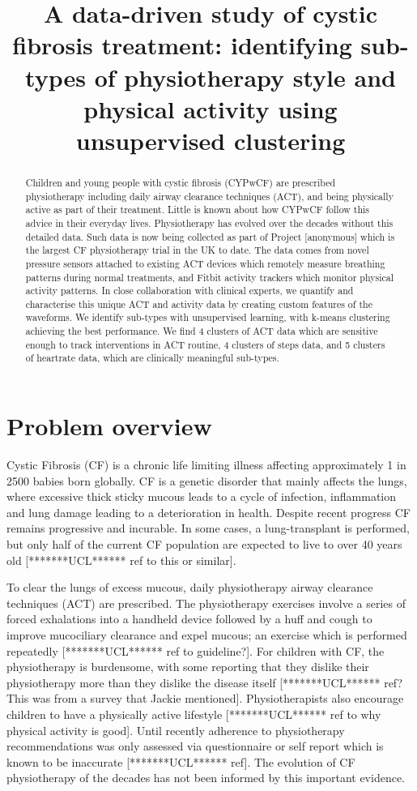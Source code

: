 \documentclass{article}
\title{A data-driven study of cystic fibrosis treatment: identifying sub-types of physiotherapy style and physical activity using unsupervised clustering}
\begin{document}
\maketitle

\begin{abstract}
  Children and young people with cystic fibrosis (CYPwCF) are prescribed physiotherapy including daily airway clearance techniques (ACT), and being physically active as part of their treatment. Little is known about how CYPwCF follow this advice in their everyday lives. Physiotherapy has evolved over the decades without this detailed data. Such data is now being collected as part of Project [anonymous] which is the largest CF physiotherapy trial in the UK to date. The data comes from novel pressure sensors attached to existing ACT devices which remotely measure breathing patterns during normal treatments, and Fitbit activity trackers which monitor physical activity patterns. In close collaboration with clinical experts, we quantify and characterise this unique ACT and activity data by creating custom features of the waveforms. We identify sub-types with unsupervised learning, with k-means clustering achieving the best performance. We find 4 clusters of ACT data which are sensitive enough to track interventions in ACT routine, 4 clusters of steps data, and 5 clusters of heartrate data, which are clinically meaningful sub-types.
\end{abstract}

\section{Problem overview}

Cystic Fibrosis (CF) is a chronic life limiting illness affecting approximately 1 in 2500 babies born globally. CF is a genetic disorder that mainly affects the lungs, where excessive thick sticky mucous leads to a cycle of infection, inflammation and lung damage leading to a deterioration in health. Despite recent progress CF remains progressive and incurable. In some cases, a lung-transplant is performed, but only half of the current CF population are expected to live to over 40 years old [*******UCL****** ref to this or similar].  

To clear the lungs of excess mucous, daily physiotherapy airway clearance techniques (ACT) are prescribed. The physiotherapy exercises involve a series of forced exhalations into a handheld device  followed by a huff and cough to improve mucociliary clearance and expel mucous; an exercise which is performed repeatedly [*******UCL****** ref to guideline?]. For children with CF, the physiotherapy is burdensome, with some reporting that they dislike their physiotherapy more than they dislike the disease itself [*******UCL****** ref? This was from a survey that Jackie mentioned]. Physiotherapists also encourage children to have a physically active lifestyle [*******UCL****** ref to why physical activity is good]. Until recently adherence to physiotherapy recommendations was only assessed via questionnaire or self report which is known to be inaccurate [*******UCL****** ref]. The evolution of CF physiotherapy of the decades has not been informed by this important evidence.  
\end{document}
